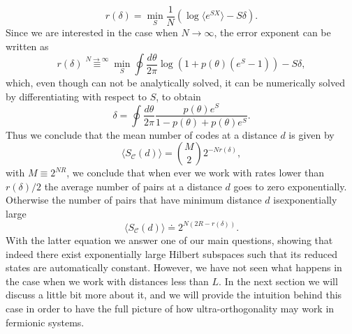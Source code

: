 \begin{equation}
r(\delta) = \min_{S} \frac{1}{N} \left(\log\langle e^{SX}\rangle - S\delta\right).
\end{equation}
\indent Since we are interested in the case when $N\to \infty$, the error exponent can be written as
\begin{equation}
r(\delta)\stackrel{N\to \infty}{\equiv}\min_{S}\oint \frac{d\theta}{2\pi}\log\left(1+p(\theta)(e^S -1)\right) -S\delta,
\label{CH2:Error_exponent}
\end{equation}
which, even though can not be analytically solved, it can be numerically solved by differentiating with respect to $S$, to obtain
\begin{equation}
\delta = \oint \frac{d\theta}{2\pi} \frac{p(\theta)e^{S}}{1-p(\theta) + p(\theta)e^S}.
\end{equation}
Thus we conclude that the mean number of codes at a distance $d$ is given by
\begin{equation}
\langle S_{\mathcal{C}}(d)\rangle = {M \choose 2} 2^{-Nr(\delta)},
\end{equation}
with $M\equiv 2^{NR}$, we conclude that when ever we work with rates lower than $r(\delta)/2$ the average number of pairs at a distance $d$ goes to zero exponentially. Otherwise the number of pairs that have minimum distance $d$ isexponentially large
\begin{equation}
\langle S_{\mathcal{C}}(d)\rangle \doteq  2^{N(2R-r(\delta))}.
\end{equation}
With the latter equation we answer one of our main questions, showing that indeed there exist exponentially large Hilbert subspaces such that its reduced states are automatically constant. However, we have not seen what happens in the case when we work with distances less than $L$. In the next section we will discuss a little bit more about it, and we will provide the intuition behind this case in order to have the full picture of how ultra-orthogonality may work in fermionic systems.

